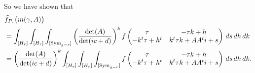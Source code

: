 So we have shown that 
\begin{align*}
	&\tilde f_{P_r}\bigl(m(\gamma, A)\bigr) \\
	 &= \int^{}_{[H_r]}\int^{}_{[H_r]}\int^{}_{[\mathrm{Sym}_{g-r}]}  \left(\frac{\det(A)}{\det(ic + d)}\right)^{k} f\begin{pmatrix} \tau & -\tau k + h\\ -k^t \tau + h^t & k^t \tau k + A A^t i + s \end{pmatrix}   \,ds\,dh\,dk\\
	&= \left(\frac{\det(A)}{\det(ic + d)}\right)^{k} \int^{}_{[H_r]}\int^{}_{[H_r]}\int^{}_{[\mathrm{Sym}_{g-r}]}  f\begin{pmatrix} \tau & -\tau k + h\\ -k^t \tau + h^t & k^t \tau k + A A^t i + s \end{pmatrix}   \,ds\,dh\,dk.\\
\end{align*}


